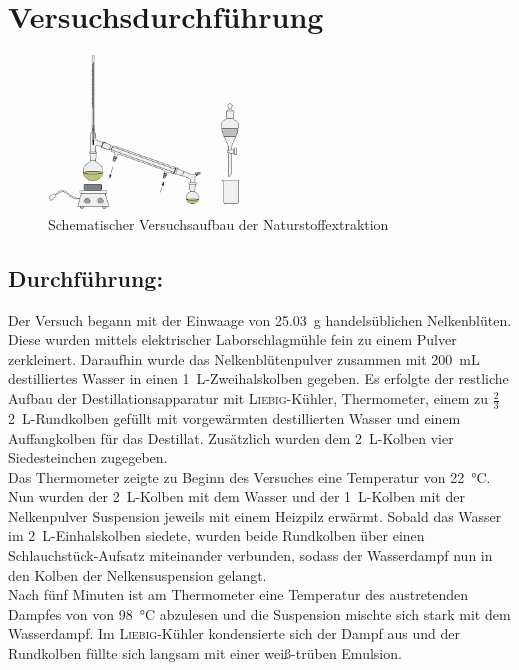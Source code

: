 \section{Versuchsdurchführung}
\label{sec:durchfuerung}
\begin{figure}[h!]
	\centering
	\includegraphics[width=0.45\textwidth]{img/versuchsaufbau_1}
	\caption{Schematischer Versuchsaufbau der Naturstoffextraktion}
	\label{fig:versuchsaufbau_1}
\end{figure}
\FloatBarrier

\subsection*{Durchführung:}

Der Versuch begann mit der Einwaage von \SI{25,03}{\gram} handelsüblichen Nelkenblüten. Diese wurden mittels elektrischer Laborschlagmühle fein zu einem Pulver zerkleinert.
Daraufhin wurde das Nelkenblütenpulver zusammen mit \SI{200 }{\milli \liter} destilliertes Wasser in einen \SI{1}{\liter}-Zweihalskolben gegeben.
Es erfolgte der restliche Aufbau der Destillationsapparatur mit \textsc{ Liebig}-Kühler, Thermometer, einem zu $\frac{2}{3}$  \SI{2}{\liter}-Rundkolben gefüllt mit vorgewärmten destillierten Wasser und einem Auffangkolben für das Destillat.
Zusätzlich wurden dem \SI{2}{\liter}-Kolben vier Siedesteinchen zugegeben.\\
Das Thermometer zeigte zu Beginn des Versuches eine Temperatur von \SI{22}{\celsius}.\\
Nun wurden der \SI{2}{\liter}-Kolben mit dem Wasser und der \SI{1}{\liter}-Kolben mit der Nelkenpulver Suspension jeweils mit einem Heizpilz erwärmt.
Sobald das Wasser im \SI{2}{\liter}-Einhalskolben siedete, wurden beide Rundkolben über einen Schlauchstück-Aufsatz miteinander verbunden, sodass der Wasserdampf nun in den Kolben der Nelkensuspension gelangt.\\
Nach fünf Minuten ist am Thermometer eine Temperatur des austretenden Dampfes von von \SI{98}{\celsius} abzulesen und die Suspension mischte sich stark mit dem Wasserdampf.
Im \textsc{Liebig}-Kühler kondensierte sich der Dampf aus und der Rundkolben füllte sich langsam mit einer weiß-trüben Emulsion.\\

